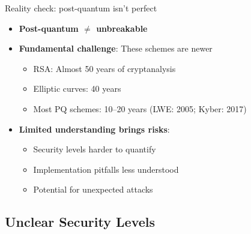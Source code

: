 \ifdefined\PRESENTATION\else\PassOptionsToClass{handout}{beamer}\fi\documentclass[aspectratio=169, lualatex]{beamer}
\begin{document}
\begin{frame}{Reality check: post-quantum isn't perfect}
	\begin{itemize}
		\item \textbf{Post-quantum $\neq$ unbreakable}
		\item \textbf{Fundamental challenge}: These schemes are newer
		      \begin{itemize}
			      \item RSA: Almost 50 years of cryptanalysis
			      \item Elliptic curves: 40 years
			      \item Most PQ schemes: 10--20 years (LWE: 2005; Kyber: 2017)
		      \end{itemize}
		\item \textbf{Limited understanding brings risks}:
		      \begin{itemize}
			      \item Security levels harder to quantify
			      \item Implementation pitfalls less understood
			      \item Potential for unexpected attacks
		      \end{itemize}
	\end{itemize}
\end{frame}

\subsection{Unclear Security Levels}
\end{document}
